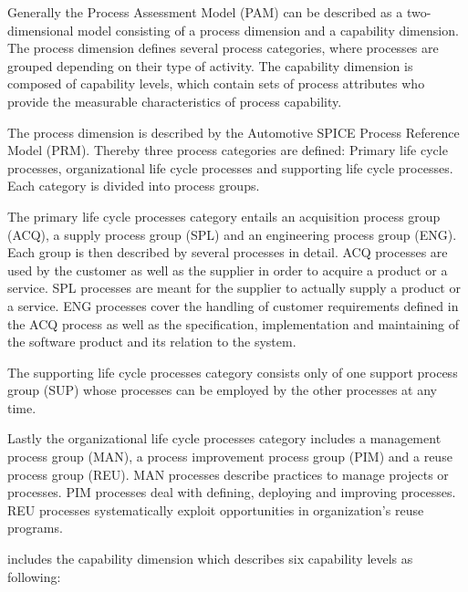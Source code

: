 Generally the \cite{AUTOSPICE} Process Assessment Model (PAM) can be described as a two-dimensional model consisting of a process dimension 
and a capability dimension. The process dimension defines several process categories, where processes are grouped depending on their type of 
activity. The capability dimension is composed of capability levels, which contain sets of process attributes who provide the measurable 
characteristics of process capability.

The process dimension is described by the Automotive SPICE Process Reference Model (PRM). Thereby three process categories are defined: Primary life
cycle processes, organizational life cycle processes and supporting life cycle processes. Each category is divided into process groups.

The primary life cycle processes category entails an acquisition process group (ACQ), a supply process group (SPL) and an engineering process 
group (ENG). Each group is then described by several processes in detail. ACQ processes are used by the customer as well as the supplier in 
order to acquire a product or a service. SPL processes are meant for the supplier to actually supply a product or a service. ENG processes 
cover the handling of customer requirements defined in the ACQ process as well as the specification, implementation and maintaining of the 
software product and its relation to the system.

The supporting life cycle processes category consists only of one support process group (SUP) whose processes can be employed by the other processes at any time.

Lastly the organizational life cycle processes category includes a management process group (MAN), a process improvement process group (PIM) 
and a reuse process group (REU). MAN processes describe practices to manage projects or processes. PIM processes deal with defining, deploying 
and improving processes. REU processes systematically exploit opportunities in organization’s reuse programs.

\cite{AUTOSPICE} includes the capability dimension which describes six capability levels as following:

